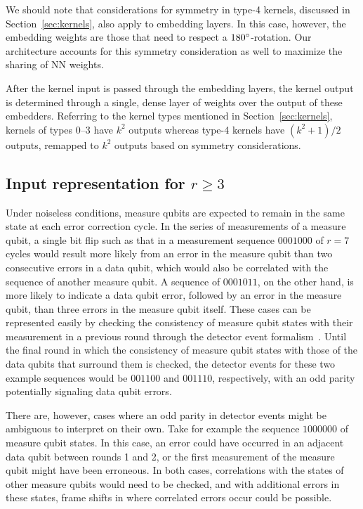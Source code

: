 We should note that considerations for symmetry in type-4 kernels, discussed in Section~\ref{sec:kernels}, also apply to embedding layers. In this case, however, the embedding weights are those that need to respect a $180^\circ$-rotation. Our architecture accounts for this symmetry consideration as well to maximize the sharing of NN weights.

After the kernel input is passed through the embedding layers, the kernel output is determined through a single, dense layer of weights over the output of these embedders. Referring to the kernel types mentioned in Section~\ref{sec:kernels}, kernels of types 0--3 have $k^2$ outputs whereas type-4 kernels have $(k^2+1)/2$ outputs, remapped to $k^2$ outputs based on symmetry considerations.


\subsection{Input representation for $r\geq 3$}
\label{sec:kernels-r3}

Under noiseless conditions, measure qubits are expected to remain in the same state at each error correction cycle.
In the series of measurements of a measure qubit, a single bit flip such as that in a measurement sequence $0001000$ of $r=7$ cycles would result more likely from an error in the measure qubit than two consecutive errors in a data qubit, which would also be correlated with the sequence of another measure qubit. A sequence of $0001011$, on the other hand, is more likely to indicate a data qubit error, followed by an error in the measure qubit, than three errors in the measure qubit itself. These cases can be represented easily by checking the consistency of measure qubit states with their measurement in a previous round through the detector event formalism~\cite{Gidney:2021,Higgott:2023,Bausch:2023jgi}. Until the final round in which the consistency of measure qubit states with those of the data qubits that surround them is checked, the detector events for these two example sequences would be $001100$ and $001110$, respectively, with an odd parity potentially signaling data qubit errors.

There are, however, cases where an odd parity in detector events might be ambiguous to interpret on their own. Take for example the sequence $1000000$ of measure qubit states. In this case, an error could have occurred in an adjacent data qubit between rounds 1 and 2, or the first measurement of the measure qubit might have been erroneous. In both cases, correlations with the states of other measure qubits would need to be checked, and with additional errors in these states, frame shifts in where correlated errors occur could be possible.

